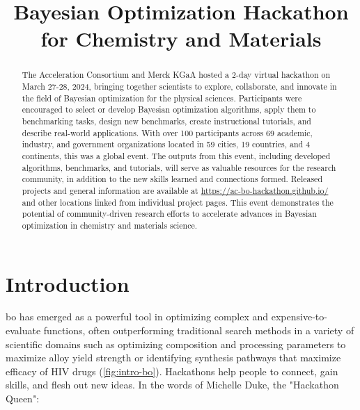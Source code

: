 \documentclass[superscriptaddress, nofootinbib,  amsmath, amssymb, twocolumn]{revtex4-2} %
\begin{document}
\title{Bayesian Optimization Hackathon for Chemistry and Materials}

% 






\begin{abstract}
The Acceleration Consortium and Merck KGaA hosted a 2-day virtual hackathon on March 27-28, 2024, bringing together scientists to explore, collaborate, and innovate in the field of Bayesian optimization for the physical sciences. Participants were encouraged to select or develop Bayesian optimization algorithms, apply them to benchmarking tasks, design new benchmarks, create instructional tutorials, and describe real-world applications. With over 100 participants across 69 academic, industry, and government organizations located in 59 cities, 19 countries, and 4 continents, this was a global event. %
The outputs from this event, including developed algorithms, benchmarks, and tutorials, will serve as valuable resources for the research community, in addition to the new skills learned and connections formed. Released projects and general information are available at \url{https://ac-bo-hackathon.github.io/} and other locations linked from individual project pages. This event demonstrates the potential of community-driven research efforts to accelerate advances in Bayesian optimization in chemistry and materials science.
\end{abstract}

\maketitle

\clearpage





\section{Introduction}

\Gls{bo} has emerged as a powerful tool in optimizing complex and expensive-to-evaluate functions, often outperforming traditional search methods in a variety of scientific domains such as optimizing composition and processing parameters to maximize alloy yield strength or identifying synthesis pathways that maximize efficacy of HIV drugs (\cref{fig:intro-bo}). Hackathons help people to connect, gain skills, and flesh out new ideas. In the words of Michelle Duke, the "Hackathon Queen":
\end{document}
